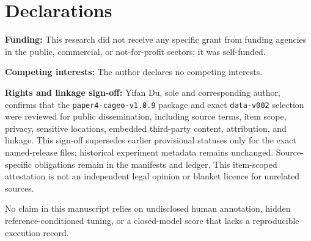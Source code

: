 \documentclass[a4paper,fleqn]{cas-sc}
\begin{document}
\section*{Declarations}

\textbf{Funding:} This research did not receive any specific grant from funding agencies in the public, commercial, or not-for-profit sectors; it was self-funded.

\textbf{Competing interests:} The author declares no competing interests.

\textbf{Rights and linkage sign-off:} Yifan Du, sole and corresponding author, confirms that the \texttt{paper4-cageo-v1.0.9} package and exact \texttt{data-v002} selection were reviewed for public dissemination, including source terms, item scope, privacy, sensitive locations, embedded third-party content, attribution, and linkage. This sign-off supersedes earlier provisional statuses only for the exact named-release files; historical experiment metadata remains unchanged. Source-specific obligations remain in the manifests and ledger. This item-scoped attestation is not an independent legal opinion or blanket licence for unrelated sources.

No claim in this manuscript relies on undisclosed human annotation, hidden reference-conditioned tuning, or a closed-model score that lacks a reproducible execution record.





\end{document}
